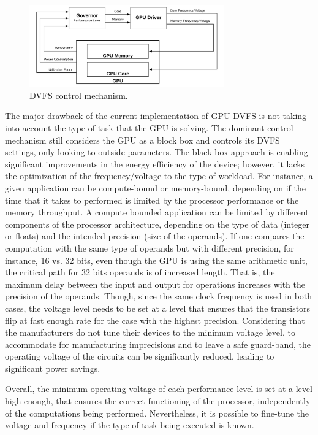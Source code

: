 \begin{figure}[!htb]
  \centering
  \includegraphics[width=0.75\textwidth]{Figures/StateArt/DVFS.png}
  \caption[Controller]{DVFS control mechanism.}
  \label{fig:DVFSmechanism}
\end{figure}

The major drawback of the current implementation of GPU DVFS is not taking into account the type of task that the GPU is solving. The dominant control mechanism still considers the GPU as a block box and controls its DVFS settings, only looking to outside parameters. The black box approach is enabling significant improvements in the energy efficiency of the device; however, it lacks the optimization of the frequency/voltage to the type of workload. For instance, a given application can be compute-bound or memory-bound, depending on if the time that it takes to performed is limited by the processor performance or the memory throughput. A compute bounded application can be limited by different components of the processor architecture, depending on the type of data (integer or floats) and the intended precision (size of the operands). If one compares the computation with the same type of operands but with different precision, for instance, 16 vs. 32 bits, even though the GPU is using the same arithmetic unit, the critical path for 32 bits operands is of increased length. That is, the maximum delay between the input and output for operations increases with the precision of the operands. Though, since the same clock frequency is used in both cases, the voltage level needs to be set at a level that ensures that the transistors flip at fast enough rate for the case with the highest precision. Considering that the manufacturers do not tune their devices to the minimum voltage level, to accommodate for manufacturing imprecisions and to leave a safe guard-band, the operating voltage of the circuits can be significantly reduced, leading to significant power savings. 

Overall, the minimum operating voltage of each performance level is set at a level high enough, that ensures the correct functioning of the processor, independently of the computations being performed. Nevertheless, it is possible to fine-tune the voltage and frequency if the type of task being executed is known.


